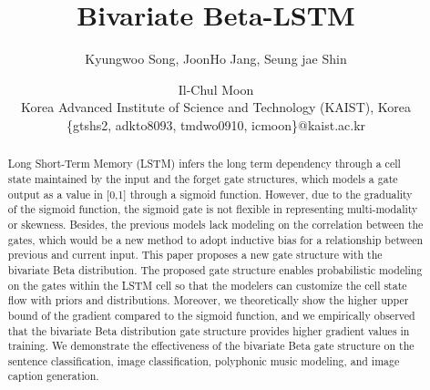 \documentclass[letterpaper]{article} %
\begin{document}
\title{Bivariate Beta-LSTM}
\author{Kyungwoo Song, JoonHo Jang, Seung jae Shin \and Il-Chul Moon \\
	Korea Advanced Institute of Science and Technology (KAIST), Korea \\
	\{gtshs2, adkto8093, tmdwo0910, icmoon\}@kaist.ac.kr}
\maketitle

\begin{abstract}
Long Short-Term Memory (LSTM) infers the long term dependency through a cell state maintained by the input and the forget gate structures, which models a gate output as a value in [0,1] through a sigmoid function. However, due to the graduality of the sigmoid function, the sigmoid gate is not flexible in representing multi-modality or skewness. Besides, the previous models lack modeling on the correlation between the gates, which would be a new method to adopt inductive bias for a relationship between previous and current input. This paper proposes a new gate structure with the bivariate Beta distribution. The proposed gate structure enables probabilistic modeling on the gates within the LSTM cell so that the modelers can customize the cell state flow with priors and distributions. Moreover, we theoretically show the higher upper bound of the gradient compared to the sigmoid function, and we empirically observed that the bivariate Beta distribution gate structure provides higher gradient values in training. We demonstrate the effectiveness of the bivariate Beta gate structure on the sentence classification, image classification, polyphonic music modeling, and image caption generation.
\end{abstract}
\end{document}
